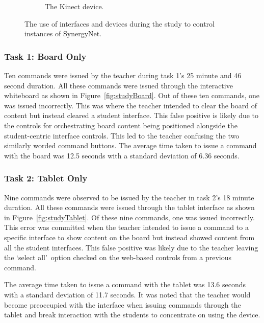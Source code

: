 \documentclass[link]{IWCOMP}
\begin{document}
\begin{figure}[t]
\begin{subfigure}[t]{0.3\textwidth}
		\caption{The Kinect device.}
		\label{fig:studyKinect}
	\end{subfigure}
   	\caption{The use of interfaces and devices during the study to control instances of SynergyNet.}
   	\label{fig:studyDevices}
\end{figure} 

\subsubsection{Task 1: Board Only}
\label{subsubsec:studyPhase1ResultsTask1}

Ten commands were issued by the teacher during task 1's 25 minute and 46 second duration.
All these commands were issued through the interactive whiteboard as shown in Figure~\ref{fig:studyBoard}.
Out of these ten commands, one was issued incorrectly.
This was where the teacher intended to clear the board of content but instead cleared a student interface.
This false positive is likely due to the controls for orchestrating board content being positioned alongside the student-centric interface controls.
This led to the teacher confusing the two similarly worded command buttons.
The average time taken to issue a command with the board was 12.5 seconds with a standard deviation of 6.36 seconds.

\subsubsection{Task 2: Tablet Only}
\label{subsubsec:studyPhase1ResultsTask2}

Nine commands were observed to be issued by the teacher in task 2's 18 minute duration.
All these commands were issued through the tablet interface as shown in Figure~\ref{fig:studyTablet}.
Of these nine commands, one was issued incorrectly.
This error was committed when the teacher intended to issue a command to a specific interface to show content on the board but instead showed content from all the student interfaces.
This false positive was likely due to the teacher leaving the \lq select all\rq\ option checked on the web-based controls from a previous command.

The average time taken to issue a command with the tablet was 13.6 seconds with a standard deviation of 11.7 seconds.
It was noted that the teacher would become preoccupied with the interface when issuing commands through the tablet and break interaction with the students to concentrate on using the device.
\end{document}

